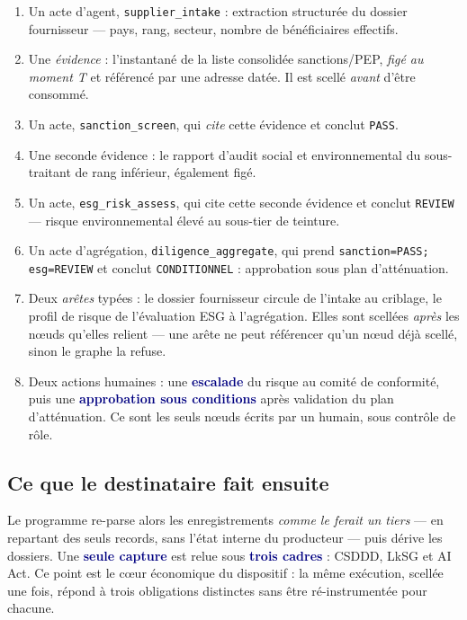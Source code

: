 \documentclass[10pt]{article}
\newcommand{\code}[1]{\texttt{\small #1}}
\newcommand{\mm}[1]{\textbf{\textcolor{navy}{#1}}}
\begin{document}
\begin{enumerate}[leftmargin=15pt,itemsep=1.5pt,topsep=3pt]
\item Un acte d'agent, \code{supplier\_intake} : extraction structurée du dossier fournisseur — pays, rang, secteur, nombre de bénéficiaires effectifs.
\item Une \emph{évidence} : l'instantané de la liste consolidée sanctions/PEP, \emph{figé au moment T} et référencé par une adresse datée. Il est scellé \emph{avant} d'être consommé.
\item Un acte, \code{sanction\_screen}, qui \emph{cite} cette évidence et conclut \code{PASS}.
\item Une seconde évidence : le rapport d'audit social et environnemental du sous-traitant de rang inférieur, également figé.
\item Un acte, \code{esg\_risk\_assess}, qui cite cette seconde évidence et conclut \code{REVIEW} — risque environnemental élevé au sous-tier de teinture.
\item Un acte d'agrégation, \code{diligence\_aggregate}, qui prend \code{sanction=PASS; esg=REVIEW} et conclut \code{CONDITIONNEL} : approbation sous plan d'atténuation.
\item[7--8.] Deux \emph{arêtes} typées : le dossier fournisseur circule de l'intake au criblage, le profil de risque de l'évaluation ESG à l'agrégation. Elles sont scellées \emph{après} les nœuds qu'elles relient — une arête ne peut référencer qu'un nœud déjà scellé, sinon le graphe la refuse.
\item[9.] Deux actions humaines : une \mm{escalade} du risque au comité de conformité, puis une \mm{approbation sous conditions} après validation du plan d'atténuation. Ce sont les seuls nœuds écrits par un humain, sous contrôle de rôle.
\end{enumerate}

\subsection{Ce que le destinataire fait ensuite}

Le programme re-parse alors les enregistrements \emph{comme le ferait un tiers} — en repartant des seuls records, sans l'état interne du producteur — puis dérive les dossiers. Une \mm{seule capture} est relue sous \mm{trois cadres} : CSDDD, LkSG et AI Act. Ce point est le cœur économique du dispositif : la même exécution, scellée une fois, répond à trois obligations distinctes sans être ré-instrumentée pour chacune.
\end{document}
